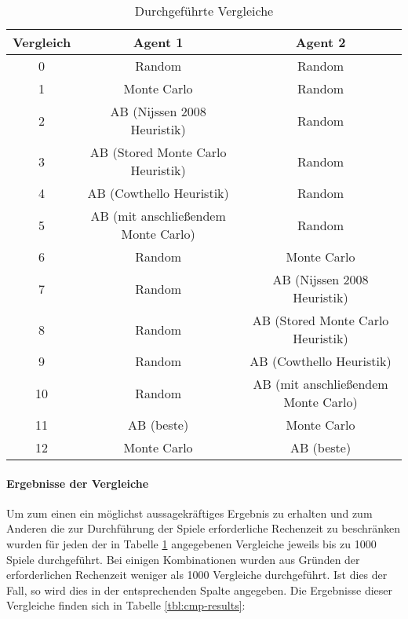 \begin{table}[ht]
\begin{center}
\begin{tabular}{| c | c | c |} \hline
Vergleich & Agent 1 & Agent 2 \\ \hline
\hline
0 & Random & Random  \\ \hline
\hline
 1 & Monte Carlo                         & Random  \\ \hline
 2 & AB (Nijssen 2008 Heuristik)         & Random\\ \hline
 3 & AB (Stored Monte Carlo Heuristik)   & Random\\ \hline
 4 & AB (Cowthello Heuristik)            & Random\\ \hline
 5 & AB (mit anschließendem Monte Carlo) & Random\\ \hline
\hline
 6 & Random                              & Monte Carlo                         \\ \hline
 7 & Random                              & AB (Nijssen 2008 Heuristik)         \\ \hline
 8 & Random                              & AB (Stored Monte Carlo Heuristik)   \\ \hline
 9 & Random                              & AB (Cowthello Heuristik)            \\ \hline
10 & Random                              & AB (mit anschließendem Monte Carlo) \\ \hline
\hline
11 & AB (beste)                          & Monte Carlo                         \\ \hline
12 & Monte Carlo                         & AB (beste)                          \\ \hline
\end{tabular}
\end{center}
\caption{Durchgeführte Vergleiche}
\label{tbl:cmp-agents}
\end{table}

\paragraph{Ergebnisse der Vergleiche}
\label{p:vgl-result}
Um zum einen ein möglichst aussagekräftiges Ergebnis zu erhalten und zum Anderen die zur Durchführung der Spiele erforderliche Rechenzeit zu beschränken wurden für jeden der in Tabelle \ref{tbl:cmp-agents} angegebenen Vergleiche jeweils bis zu 1000 Spiele durchgeführt. Bei einigen Kombinationen wurden aus Gründen der erforderlichen Rechenzeit weniger als 1000 Vergleiche durchgeführt. Ist dies der Fall, so wird dies in der entsprechenden Spalte angegeben. Die Ergebnisse dieser Vergleiche finden sich in Tabelle \ref{tbl:cmp-results}:

